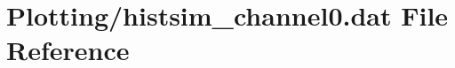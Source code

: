 \hypertarget{Plotting_2histsim__channel0_8dat}{}\section{Plotting/histsim\+\_\+channel0.dat File Reference}
\label{Plotting_2histsim__channel0_8dat}
